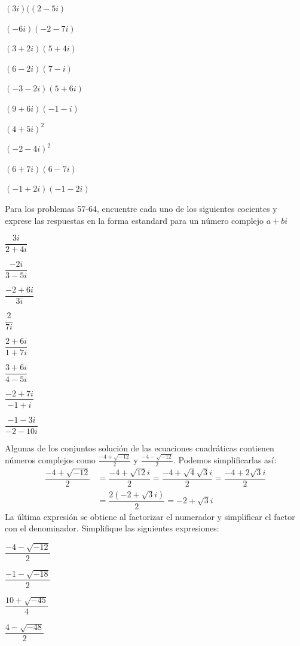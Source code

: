 \documentclass[letterpaper]{article}
\begin{document}
\begin{multicols}{2}
\begin{enumerate}
\begin{multicols}{2}
      \item $ (3i)((2-5i) $ \item $ (-6i)(-2-7i) $
      \item $ (3+2i)(5+4i) $ \item $ (6-2i)(7-i) $
      \item $ (-3-2i)(5+6i) $ \item $ (9+6i)(-1-i) $
      \item $ (4+5i)^2 $ \item $ (-2-4i)^2 $
      \item $ (6+7i)(6-7i) $ \item $ (-1+2i)(-1-2i) $
    \end{multicols}
    Para los problemas 57-64, encuentre cada uno de los siguientes cocientes y exprese las respuestas en la forma estandard para un número complejo $ a+bi $
    \begin{multicols}{2}
      \item $ \dfrac{3i}{2+4i} $ \item $ \dfrac{-2i}{3-5i} $ 
      \item $ \dfrac{-2+6i}{3i} $ \item $ \dfrac{2}{7i} $
      \item $ \dfrac{2+6i}{1+7i} $ \item $ \dfrac{3+6i}{4-5i} $
      \item $ \dfrac{-2+7i}{-1+i} $ \item $ \dfrac{-1-3i}{-2-10i} $
    \end{multicols}
    Algunas de los conjuntos solución de las ecuaciones cuadráticas contienen números complejos como $ \frac{-4+\sqrt{-12}}{2} $ y $ \frac{-4-\sqrt{-12}}{2} $. Podemos simplificarlas así:
    \begin{align*}
    \dfrac{-4+\sqrt{-12}}{2}&=\dfrac{-4+\sqrt{12}i}{2}=\dfrac{-4+\sqrt{4}\sqrt{3}i}{2}=\dfrac{-4+2\sqrt{3}i}{2}\\
    &=\dfrac{2(-2+\sqrt{3}i)}{2}=-2+\sqrt{3}i  
    \end{align*}
    La última expresión se obtiene al factorizar el numerador y simplificar el factor con el denominador. Simplifique las siguientes expresiones:
    \begin{multicols}{2}
    \item $ \dfrac{-4-\sqrt{-12}}{2} $ \item $ \dfrac{-1-\sqrt{-18}}{2}$
    \item $ \dfrac{10+\sqrt{-45}}{4} $ \item $ \dfrac{4-\sqrt{-48}}{2} $
    \end{multicols}
    \end{enumerate}
  \end{multicols}
  
\end{document}
